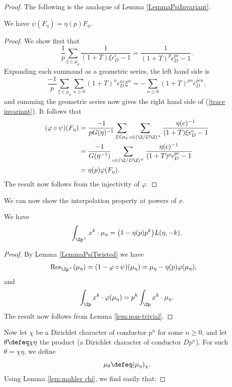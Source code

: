 \documentclass[a4paper,10pt, english, reqno]{smfart}
\numberwithin{equation}{section}
\begin{document}
\begin{proof}
The following is the analogue of Lemma \ref{LemmaPsiInvariant}.

\begin{lemma} \label{LemmaPsiTwisted}
We have $\psi(F_\eta) = \eta(p)F_\eta$.
\end{lemma}

\begin{proof}
We show first that 
\begin{equation}\label{trace invariant}\frac{1}{p}\sum_{\xi \in \mu_p}\frac{1}{(1+T)\xi\epsilon_D^c -1} = \frac{1}{(1+T)^p \epsilon_D^{pc} - 1}.\end{equation}
Expanding each summand as a geometric series, the left hand side is 
\[\frac{-1}{p}\sum_{\xi\in\mu_p}\sum_{n\geq 0}(1+T)^n\epsilon_D^{nc}\xi^n = -\sum_{n\geq 0}(1+T)^{pn}\epsilon_D^{pcn},\]
and summing the geometric series now gives the right hand side of (\ref{trace invariant}). It follows that
\begin{align*}(\varphi\circ\psi)(F_\eta) &= \frac{-1}{pG(\eta)^{-1}}\sum_{\xi\in\mu_p}\sum_{c\in(\Z/D\Z)^\times}\frac{\eta(c)^{-1}}{(1+T)\xi\epsilon_D^c - 1}\\
&= \frac{-1}{G(\eta^{-1})}\sum_{c\in(\Z/D\Z)^\times}\frac{\eta(c)^{-1}}{(1+T)^p\epsilon_D^{pc} - 1}\\
&= \eta(p)\varphi(F_\eta).
\end{align*}
The result now follows from the injectivity of $\varphi$.
\end{proof}

We can now show the interpolation property at powers of $x$.

\begin{lemma} \label{LemmaInterpolation3}
We have
\[\int_{\Zp^\times}x^k \cdot\mu_{\eta} = \big(1-\eta(p)p^k\big)L(\eta,-k).\]
\end{lemma}

\begin{proof}
By Lemma \ref{LemmaPsiTwisted} we have
\begin{align*}\mathrm{Res}_{\Zp^\times}(\mu_\eta) &= (1-\varphi\circ\psi)(\mu_\eta) = \mu_\eta - \eta(p)\varphi(\mu_\eta),
\end{align*}
and
\[\int_{\Zp}x^k\cdot\varphi(\mu_\eta) = p^k\int_{\Zp}x^k \cdot\mu_\eta.\]
The result now follows from Lemma \ref{lem:non-trivial}.
\end{proof}

Now let $\chi$ be a Dirichlet character of conductor $p^n$ for some $n\geq 0$, and let $\theta \defeq \chi\eta$ the product (a Dirichlet character of conductor $Dp^n$). For such $\theta = \chi \eta$, we define
\begin{equation} \mu_\theta \defeq (\mu_\eta)_\chi. \end{equation}
Using Lemma \ref{lem:mahler chi}, we find easily that:


\end{proof}
\end{document}
